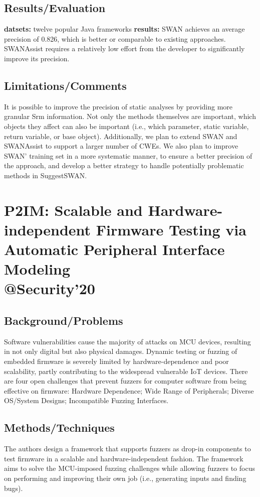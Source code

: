 \subsection{Results/Evaluation}
\textbf{datsets:} twelve popular Java frameworks
\textbf{results:} SWAN achieves an average precision of 0.826, which is better or comparable to existing approaches. SWANAssist requires a relatively low effort from the developer to significantly improve its precision.

\subsection{Limitations/Comments}
It is possible to improve the precision of static analyses by providing more granular Srm information. Not only the methods themselves are important, which objects they affect can also be important
(i.e., which parameter, static variable, return variable, or base object). Additionally, we plan to extend SWAN and SWANAssist to support a larger number of CWEs. We also plan to improve SWAN’ training set in a more systematic manner, to ensure a better precision of the approach, and develop a better strategy to handle potentially problematic methods in SuggestSWAN.
\newpage

\section{P2IM: Scalable and Hardware-independent Firmware Testing via Automatic Peripheral Interface Modeling \\@Security'20}\label{p2im}
\subsection{Background/Problems}
Software vulnerabilities cause the majority of attacks on MCU devices, resulting in not only digital but also physical damages. Dynamic testing or fuzzing of embedded firmware is severely limited by hardware-dependence and poor scalability, partly contributing to the widespread vulnerable IoT devices. There are four open challenges that prevent fuzzers for computer software from being effective on firmware: Hardware Dependence; Wide Range of Peripherals; Diverse OS/System Designs; Incompatible Fuzzing Interfaces.
\subsection{Methods/Techniques}
The authors design a framework that supports fuzzers as drop-in components to test firmware in a scalable and hardware-independent fashion.  The framework aims to solve the MCU-imposed fuzzing challenges while allowing fuzzers to focus on performing and improving their own job (i.e., generating inputs and finding bugs). 

